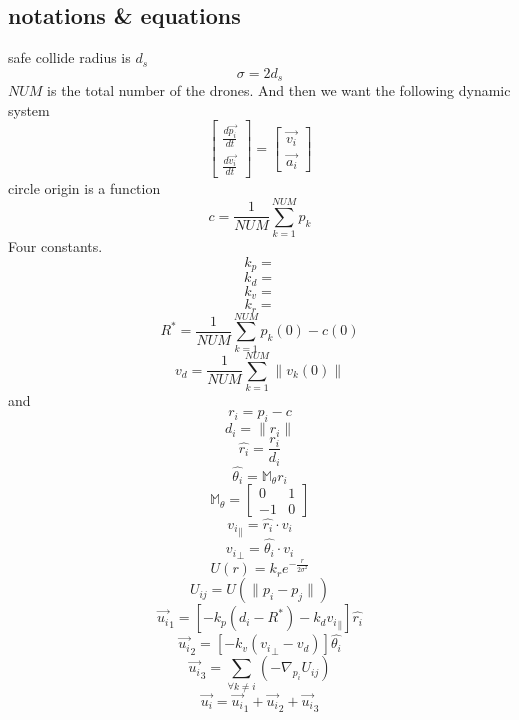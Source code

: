 \documentclass{article}
\theoremstyle{definition} %
\begin{document}
\subsection{notations \& equations}
safe collide radius is \(d_s\)
\[
    \sigma=2d_s
\]
\(NUM\) is the total number of the drones.
And then we want the following dynamic system
\[\begin{bmatrix}
        \frac{d\vec{p_i}}{dt} \\
        \frac{d\vec{v_i}}{dt}
    \end{bmatrix}=
    \begin{bmatrix}
        \vec{v_i} \\
        \vec{a_i}
    \end{bmatrix}
\]
circle origin is a function
\[
    c=\frac{1}{NUM}\sum_{k=1}^{NUM}p_k
\]
Four constants.
\[
    k_p=
\]
\[
    k_d=
\]
\[
    k_v=
\]
\[
    k_r=
\]
\[
    R^*=\frac{1}{NUM}\sum_{k=1}^{NUM}p_k(0)-c(0)
\]
\[
    v_d=\frac{1}{NUM}\sum_{k=1}^{NUM}\|v_k(0)\|
\]
and
\[
    r_i=p_i-c
\]
\[
    d_i=\|r_i\|
\]
\[
    \hat{r_i}=\frac{r_i}{d_i}
\]
\[
    \hat{\theta_i}=\mathbb{M}_\theta r_i
\]
\[
    \mathbb{M}_\theta=
    \begin{bmatrix}
        0  & 1 \\
        -1 & 0
    \end{bmatrix}
\]
\[
    {v_{i}}_{\parallel}=\hat{r_i}\cdot v_i
\]
\[
    {v_{i}}_{\perp}=\hat{\theta_i}\cdot v_i
\]
\[
    U(r)=k_re^{-\frac{r}{2\sigma^2}}
\]
\[
    U_{ij}=U(\|p_i-p_j\|)
\]
\[
    \vec{u_i}_1=[-k_p(d_i-R^*)-k_d{v_{i}}_{\parallel}]\hat{r_i}
\]
\[
    \vec{u_i}_2=[-k_v({v_{i}}_{\perp}-v_d)]\hat{\theta_i}
\]
\[
    \vec{u_i}_3=\sum_{\forall k\neq i}(-\nabla_{p_i}U_{ij})
\]
\[
    \vec{u_i}=\vec{u_i}_1+\vec{u_i}_2+\vec{u_i}_3
\]




\end{document}
